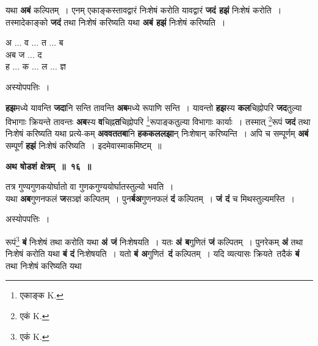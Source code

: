 \documentclass[11pt, openany]{book}
\begin{document}
\begin{flushleft}
\begin{minipage}[t]{0.6\textwidth}
\hspace{4mm} यथा \textbf{अबं} कल्पितम्~। एनम् एकाङ्कस्तावद्वारं निःशेषं करोति यावद्वारं \textbf{जदं हझं} निःशेषं करोति~। तस्मादेकाङ्को \textbf{जदं} तथा निःशेषं करिष्यति यथा \textbf{अबं हझं} निःशेषं करिष्यति~।
\end{minipage} 
\hfill
\begin{minipage}[t]{0.3\textwidth}
अ ... व ... त ... ब\\
{\color{white}अब} ज ... द \\
ह ... क ... ल ... ज्ञ 
\end{minipage}
\end{flushleft}

\begin{center}
अस्योपपत्तिः~।
\end{center}

\textbf{हझ}मध्ये यावन्ति \textbf{जदा}नि सन्ति तावन्ति \textbf{अब}मध्ये रूपाणि सन्ति~। यावन्तो \textbf{हझ}स्य \textbf{कल}चिह्नोपरि \textbf{जद}तुल्या विभागाः क्रियन्ते तावन्तः \textbf{अब}स्य \textbf{व}चिह्न\textbf{त}चिह्नोपरि \renewcommand{\thefootnote}{१}\footnote{एकाङ्क {\en K.}}रूपाङ्कतुल्या विभागाः कार्याः~। तस्मात् \renewcommand{\thefootnote}{२}\footnote{एकं {\en K.}}रूपं \textbf{जदं} तथा निःशेषं करिष्यति यथा प्रत्ये-कम् \textbf{अववततबा}नि \textbf{हककललझा}न् निःशेषान् करिष्यन्ति~। अपि च सम्पूर्णम् \textbf{अबं} सम्पूर्णं \textbf{हझं} निःशेषं करिष्यति~। इदमेवास्माकमिष्टम्~॥ 
 \vspace{2mm}

\begin{center}
\textbf{\large अथ षोडशं क्षेत्रम्~॥~१६~॥}
\end{center}
 
 {\ab तत्र गुण्यगुणकयोर्घातो वा गुणकगुण्ययोर्घातस्तुल्यो भवति~। }\\

 यथा \textbf{अब}गुणनफलं \textbf{ज}सञ्ज्ञं कल्पितम्~। पुन\textbf{र्बअ}गुणनफलं \textbf{दं} कल्पितम्~। \textbf{जं दं} च मिथस्तुल्यमस्ति~। 

\newpage
\begin{center}
अस्योपपत्तिः~।
\end{center}

रूपं\renewcommand{\thefootnote}{१}\footnote{एकं {\en K.}} \textbf{बं} निःशेषं तथा करोति यथा \textbf{अं जं} निःशेषयति~। यतः \textbf{अं ब}गुणितं \textbf{जं} कल्पितम्~। पुनरेकम् \textbf{अं} तथा निःशेषं करोति यथा \textbf{बं दं} निःशेषयति~। यतो \textbf{बं अ}गुणितं \,\textbf{दं} कल्पितम्~। यदि व्यत्यासः क्रियते \,तदैकं \textbf{बं} तथा निःशेषं करिष्यति यथा 
\vspace{-3mm}
\end{document}

